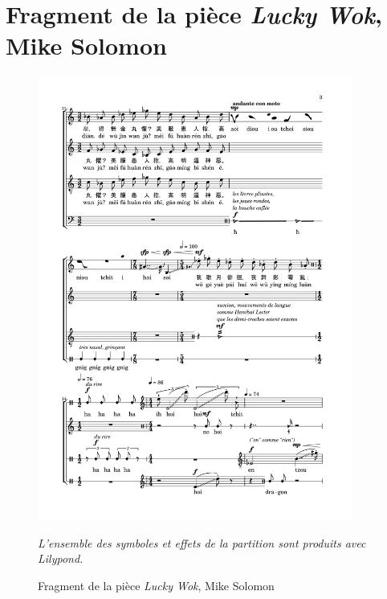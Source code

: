 \section{Fragment de la pièce \textit{Lucky Wok}, Mike Solomon}
\label{sec:luckyWokSolomon}
\begin{figure}[H]
	\centering
	\includegraphics[keepaspectratio=true, width=0.92\textwidth]{Annexes/i/lucky.png}
	\caption{Fragment de la pièce \textit{Lucky Wok}, Mike Solomon}
	\medskip
	\small
	\it
	L'ensemble des symboles et effets de la partition sont produits avec Lilypond. 	
	\label{fig:luckyWokSolomon}
\end{figure}

